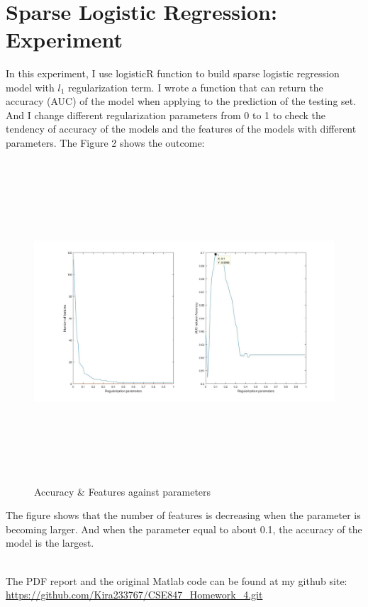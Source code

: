 \documentclass[letterpaper,12pt]{article}
\begin{document}
\quad \\

\section{Sparse Logistic Regression: Experiment}
In this experiment, I use logisticR function to build sparse logistic regression model with $l_1$ regularization term. I wrote a function that can return the accuracy (AUC) of the model when applying to the prediction of the testing set. And I change different regularization parameters from 0 to 1 to check the tendency of accuracy of the models and the features of the models with different parameters. The Figure 2 shows the outcome:
\begin{center}
\begin{figure}[H]
\includegraphics[width = 17cm, height = 12cm]{"Figure2.jpg"}
\caption{Accuracy \& Features against parameters}
\end{figure}
\end{center}
The figure shows that the number of features is decreasing when the parameter is becoming larger. And when the parameter equal to about 0.1, the accuracy of the model is the largest.


\quad
\\



The PDF report and the original Matlab code can be found at my github site:   
\url{https://github.com/Kira233767/CSE847_Homework_4.git}
\end{document}
